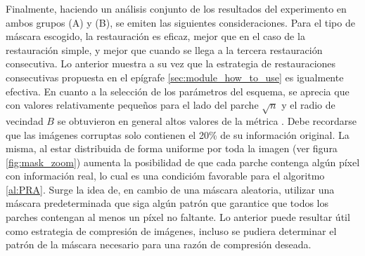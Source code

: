 Finalmente, haciendo un an\'alisis conjunto de los resultados del experimento en ambos grupos (A) y (B), se emiten las siguientes consideraciones. Para el tipo de m\'ascara escogido, la restauraci\'on \SOP es eficaz, mejor que \TELEA en el caso de la restauraci\'on simple, y mejor que \NS cuando se llega a la tercera restauraci\'on consecutiva. Lo anterior muestra a su vez que la estrategia de restauraciones consecutivas propuesta en el ep\'igrafe \ref{sec:module_how_to_use} es igualmente efectiva. En cuanto a la selecci\'on de los par\'ametros del esquema, se aprecia que con valores relativamente pequeños para el lado del parche $\sqrt{n}$ y el radio de vecindad $B$ se obtuvieron en general altos valores de la m\'etrica \PSNR. Debe recordarse que las im\'agenes corruptas solo contienen el 20\% de su informaci\'on original. La misma, al estar distribuida de forma uniforme por toda la imagen (ver figura \ref{fig:mask_zoom}) aumenta la posibilidad de que cada parche contenga alg\'un p\'ixel con informaci\'on real, lo cual es una condici\'om favorable para el algoritmo \ref{al:PRA}. Surge la idea de, en cambio de una m\'ascara aleatoria, utilizar una m\'ascara predeterminada que siga alg\'un patr\'on que garantice que todos los parches contengan al menos un p\'ixel no faltante. Lo anterior puede resultar \'util como estrategia de compresi\'on de im\'agenes, incluso se pudiera determinar el patr\'on de la m\'ascara necesario para una raz\'on de compresi\'on deseada.

